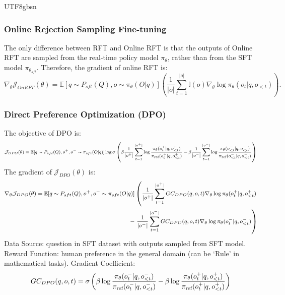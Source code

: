 \documentclass[11pt, a4paper, logo, copyright, nonumbering]{deepseek}
\begin{document}
\begin{CJK*}{UTF8}{gbsn}
\subsubsection{Online Rejection Sampling Fine-tuning}
The only difference between RFT and Online RFT is that the outputs of Online RFT are sampled from the real-time policy model $\pi_{\theta}$, rather than from the SFT model $\pi_{\theta_{sft}}$. Therefore, the gradient of online RFT is:
\begin{equation}
\nabla_{\theta}\mathcal{J}_{OnRFT}(\theta)= \mathbb{E}[{q \sim P_{sft}(Q), o \sim \pi_{\theta}(O|q)}]\left( \frac{1}{|o|}\sum_{t=1}^{|o|} {\mathbb{I}(o)} \nabla_{\theta}\log \pi_\theta(o_{t} | q, o_{<t})\right).
\end{equation}

\subsubsection{Direct Preference Optimization (DPO)}
The objective of DPO is:
\begin{equation}
\footnotesize
\begin{split}
    \mathcal{J}_{DPO}(\theta) = \mathbb{E}{[q \sim P_{sft}(Q), o^+, o^- \sim \pi_{sft}(O|q)]} \log \sigma \left(  \beta \frac{1}{|o^+|}\sum_{t=1}^{|o^+|} \log \frac{\pi_{\theta}(o^+_t | q, o^+_{<t})}{\pi_{\text{ref}}(o^+_t | q, o^+_{<t})} - \beta \frac{1}{|o^-|}\sum_{t=1}^{|o^-|} \log \frac{\pi_{\theta}(o^-_{<t} | q, o^-_{<t})}{\pi_{\text{ref}}(o^-_{<t} | q,o^-_{<t})} \right) 
\end{split}
\end{equation}
The gradient of $\mathcal{J}_{DPO}(\theta)$ is:
\begin{equation}
\footnotesize
\begin{split}
    \nabla_{\theta}\mathcal{J}_{DPO}(\theta)  = \mathbb{E}{[q \sim P_{sft}(Q), o^+, o^- \sim \pi_{sft}(O|q)]}
     & \left( \frac{1}{|o^+|}\sum_{t=1}^{|o^+|} GC_{DPO}  (q,o,t) \nabla_{\theta}\log\pi_{\theta}(o^+_t | q, o^+_{<t}) \right. \\
    - & \left. \frac{1}{|o^-|}\sum_{t=1}^{|o^-|}  GC_{DPO}  (q,o,t) \nabla_{\theta}\log\pi_{\theta}(o^-_t | q, o^-_{<t}) \right)
\end{split}
\end{equation}
Data Source:  question in SFT dataset with outputs sampled from SFT model.
Reward Function: human preference in the general domain (can be `Rule' in mathematical tasks).
Gradient Coefficient: 
\begin{equation}
\footnotesize
GC_{DPO}(q,o,t) = \sigma\left(\beta\log \frac{\pi_{\theta}(o^-_t | q, o^-_{<t})}{\pi_{\text{ref}}(o^-_t | q, o^-_{<t})} - \beta\log \frac{\pi_{\theta}(o^+_t | q, o^+_{<t})}{\pi_{\text{ref}}(o^+_t | q, o^+_{<t})}\right) 
\label{eq:GC-DPO}
\end{equation}



\end{CJK*}
\end{document}

